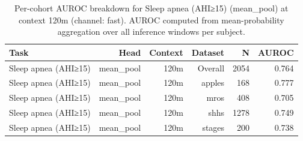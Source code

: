 \begin{table}[ht]
\centering
\caption{Per-cohort AUROC breakdown for Sleep apnea (AHI≥15) (mean_pool) at context 120m (channel: fast). AUROC computed from mean-probability aggregation over all inference windows per subject.}
\label{tab:cohort_apnea_binary_mean_pool_fast}
\begin{tabular}{lrrrrr}
\toprule
Task & Head & Context & Dataset & N & AUROC \\
\midrule
Sleep apnea (AHI≥15) & mean_pool & 120m & Overall & 2054 & 0.764 \\
Sleep apnea (AHI≥15) & mean_pool & 120m & apples & 168 & 0.777 \\
Sleep apnea (AHI≥15) & mean_pool & 120m & mros & 408 & 0.705 \\
Sleep apnea (AHI≥15) & mean_pool & 120m & shhs & 1278 & 0.749 \\
Sleep apnea (AHI≥15) & mean_pool & 120m & stages & 200 & 0.738 \\
\bottomrule
\end{tabular}
\end{table}